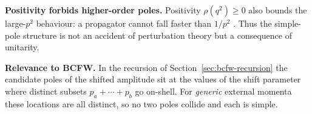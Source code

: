 \textbf{Positivity forbids higher-order poles.} Positivity $\rho(q^2) \geq 0$ also bounds the large-$p^2$ behaviour: a propagator cannot fall faster than $1/p^2$ \autocite[\S24.2]{schwartzQFT2014}. 
Thus the simple-pole structure is not an accident of perturbation theory but a consequence of unitarity.

\textbf{Relevance to BCFW.} In the recursion of Section~\ref{sec:bcfw-recursion} the candidate poles of the shifted amplitude sit at the values of the shift parameter where distinct subsets $p_a + \cdots + p_b$ go on-shell. For \emph{generic} external momenta these locations are all distinct, so no two poles collide and each is simple.
